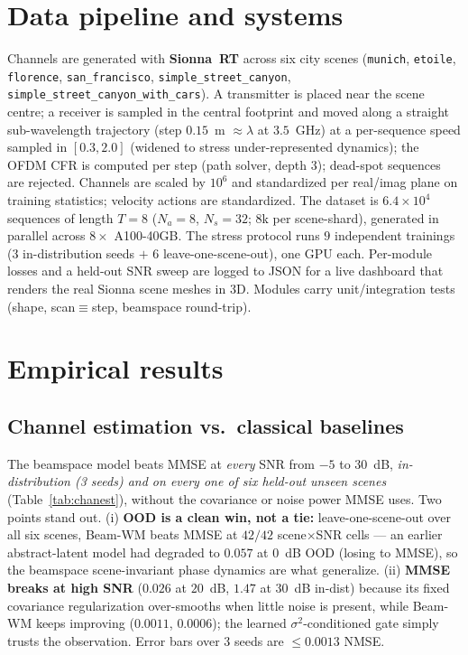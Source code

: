 \documentclass[11pt]{article}
\begin{document}
\section{Data pipeline and systems}\label{sec:data}

Channels are generated with \textbf{Sionna~RT} across six city scenes (\texttt{munich},
\texttt{etoile}, \texttt{florence}, \texttt{san\_francisco}, \texttt{simple\_street\_canyon},
\texttt{simple\_street\_canyon\_with\_cars}). A transmitter is placed near the scene centre; a
receiver is sampled in the central footprint and moved along a straight sub-wavelength trajectory
(step $0.15$~m $\approx\lambda$ at $3.5$~GHz) at a per-sequence speed sampled in $[0.3,2.0]$ (widened
to stress under-represented dynamics); the OFDM CFR is computed per step (path solver, depth $3$);
dead-spot sequences are rejected. Channels are scaled by $10^6$ and standardized per real/imag plane
on training statistics; velocity actions are standardized. The dataset is $6.4{\times}10^4$ sequences
of length $T{=}8$ ($N_a{=}8$, $N_s{=}32$; $8$k per scene-shard), generated in parallel across
$8\times$ A100-40GB. The stress protocol runs $9$ independent trainings ($3$ in-distribution seeds
$+$ $6$ leave-one-scene-out), one GPU each. Per-module losses and a
held-out SNR sweep are logged to JSON for a live dashboard that renders the real Sionna scene meshes
in 3D. Modules carry unit/integration tests (shape, scan$\equiv$step, beamspace round-trip).

\section{Empirical results}\label{sec:results}

\subsection{Channel estimation vs.\ classical baselines}
The beamspace model beats MMSE at \emph{every} SNR from $-5$ to $30$~dB, \emph{in-distribution
(3 seeds) and on every one of six held-out unseen scenes} (Table~\ref{tab:chanest}), without the
covariance or noise power MMSE uses. Two points stand out. (i) \textbf{OOD is a clean win, not a tie:}
leave-one-scene-out over all six scenes, Beam-WM beats MMSE at $42/42$ scene$\times$SNR cells --- an
earlier abstract-latent model had degraded to $0.057$ at $0$~dB OOD (losing to MMSE), so the
beamspace scene-invariant phase dynamics are what generalize. (ii) \textbf{MMSE breaks at high SNR}
($0.026$ at $20$~dB, $1.47$ at $30$~dB in-dist) because its fixed covariance regularization
over-smooths when little noise is present, while Beam-WM keeps improving ($0.0011$, $0.0006$); the
learned $\sigma^2$-conditioned gate simply trusts the observation. Error bars over 3 seeds are
$\le\!0.0013$ NMSE.
\end{document}
